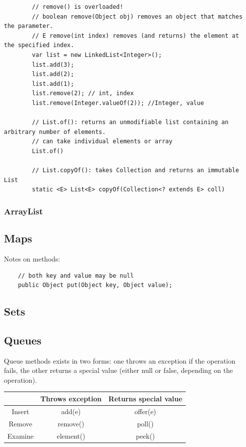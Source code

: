 \documentclass{scrartcl}
\begin{document}
    \begin{lstlisting}
        // remove() is overloaded!
        // boolean remove(Object obj) removes an object that matches the parameter.
        // E remove(int index) removes (and returns) the element at the specified index.
        var list = new LinkedList<Integer>();
        list.add(3);
        list.add(2);
        list.add(1);
        list.remove(2); // int, index
        list.remove(Integer.valueOf(2)); //Integer, value

        // List.of(): returns an unmodifiable list containing an arbitrary number of elements.
        // can take individual elements or array
        List.of()

        // List.copyOf(): takes Collection and returns an immutable List
        static <E> List<E> copyOf(Collection<? extends E> coll)
        \end{lstlisting}


\subsubsection{ArrayList}




\subsection{Maps}

Notes on methods:

 \begin{lstlisting}
    // both key and value may be null
    public Object put(Object key, Object value);
\end{lstlisting}



\subsection{Sets}

\subsection{Queues}

    Queue methods exists in two forms: one throws an exception if the operation fails, the other returns a special value (either null or false, depending on the operation).

    \bigskip

    \begin{tabular}{|c|c|c|}
        \hline
        & Throws exception & Returns special value \\
        \hline
        Insert & add(e) & offer(e) \\
        \hline
        Remove & remove() & poll() \\
        \hline
        Examine & element() & peek() \\
        \hline
    \end{tabular}
\end{document}
